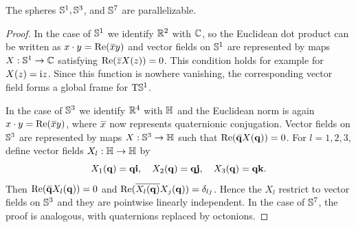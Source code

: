 \begin{prop}[{{\cite[Prop.~2.3.17]{RS1}}}]
    The spheres $\bbS^1,\bbS^3$, and $\bbS^7$ are parallelizable.
\end{prop}
\begin{proof}
    In the case of $\bbS^1$ we identify $\bbR^2$ with $\bbC$, so the Euclidean dot product can be written as $x\cdot y=\Re(\wb{x}y)$ and vector fields on $\bbS^1$ are represented by maps $X:\bbS^1\to \bbC$ satisfying $\Re(\wb{z}X(z))=0$. This condition holds for example for $X(z)=\rmi z$. Since this function is nowhere vanishing, the corresponding vector field forms a global frame for $\T\bbS^1$.

    In the case of $\bbS^3$ we identify $\bbR^4$ with $\bbH$ and the Euclidean norm is again $x\cdot y=\Re(\wb{x}y)$, where $\wb{x}$ now represents quaternionic conjugation. Vector fields on $\bbS^3$ are represented by maps $X:\bbS^3\to\bbH$ such that $\Re(\wb{\bf{q}}X(\bf{q}))=0$. For $l=1,2,3$, define vector fields $X_l:\bbH\to \bbH$ by
    \[X_1(\bf{q})=\bf{q}\bf{i},\quad X_2(\bf{q})=\bf{q}\bf{j},\quad X_3(\bf{q})=\bf{q}\bf{k}.\]
    Then $\Re(\wb{\bf{q}}X_l(\bf{q}))=0$ and $\Re(\overline{X_l(\bf{q})}X_j(\bf{q}))=\delta_{lj}$. Hence the $X_l$ restrict to vector fields on $\bbS^3$ and they are pointwise linearly independent. In the case of $\bbS^7$, the proof is analogous, with quaternions replaced by octonions.
\end{proof}

